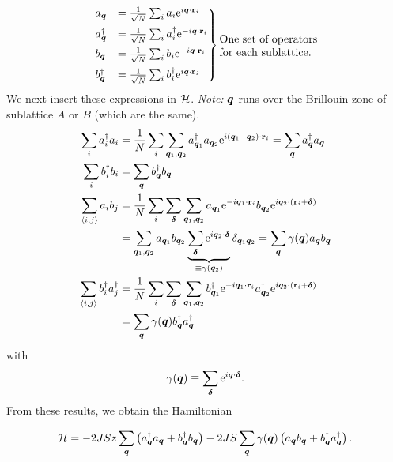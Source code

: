 \begin{equation}
	\begin{rcases}
	a_{\vq} &= \frac{1}{\sqrt{N}}\sum_{i}a_{i} \e^{i\vq\cdot\vb{r}_i} \\
	a_{\vq}^{\dg} &= \frac{1}{\sqrt{N}}\sum_{i}a_i^{\dg} \e^{-i\vq\cdot\vb{r}_i} \\
	b_{\vq} &= \frac{1}{\sqrt{N}}\sum_{i}b_{i} \e^{-i\vq\cdot\vb{r}_i} \\
	b_{\vq}^{\dg} &= \frac{1}{\sqrt{N}}\sum_{i}b_i^{\dg} \e^{i\vq\cdot\vb{r}_i}
	\end{rcases}\parbox[h]{3.1cm}{One set of operators for each sublattice.}
\end{equation}
We next insert these expressions in $\mathcal{H}$. 
\emph{Note:} $\bm{q}$ runs over the Brillouin-zone of sublattice $A$ or $B$ (which are the same).
\begin{align}
		\sum_{i}a_{i}^{\dagger} a_{i} &= \frac{1}{N}\sum_{i}\sum_{\bm{q}_1, \bm{q}_2}a_{\bm{q}_1}^{\dagger}a_{\bm{q}_2}\mathrm{e}^{i(\bm{q}_1-\bm{q}_2)\cdot\vb{r}_i} = \sum_{\bm{q}}a_{\bm{q}}^{\dagger}a_{\bm{q}} \\\
		\sum_{i}b_{i}^{\dagger} b_{i} &=\sum_{\bm{q}}b_{\bm{q}}^{\dagger}b_{\bm{q}} \\
		\sum_{\langle i,j \rangle}a_{i}b_{j} &= \frac{1}{N}\sum_{i}\sum_{\bm{\delta}}\sum_{\bm{q}_1, \bm{q}_2}a_{\bm{q}_1}\mathrm{e}^{-i\bm{q}_1\cdot \vb{r}_i}b_{\bm{q}_2}\mathrm{e}^{i\bm{q}_2\cdot (\vb{r}_i + \bm{\delta})} \nonumber \\
		&=\sum_{\bm{q}_1, \bm{q}_2} a_{\bm{q}_1}b_{\bm{q}_2} \underbrace{\sum_{\bm{\delta}}\mathrm{e}^{i\bm{q}_2\cdot\bm{\delta}}}_{\equiv \gamma(\bm{q}_2)}\delta_{\bm{q}_1\bm{q}_2} =\sum_{\bm{q}}\gamma(\bm{q})a_{\bm{q}}b_{\bm{q}} \\
		\sum_{\langle i,j \rangle}b_{i}^{\dagger}a_{j}^{\dagger} &= \frac{1}{N}\sum_{i}\sum_{\bm{\delta}}\sum_{\bm{q}_1, \bm{q}_2}b_{\bm{q}_1}^{\dagger}\mathrm{e}^{-i\bm{q}_1\cdot \vb{r}_i} a_{\bm{q}_2}^{\dagger}\mathrm{e}^{i\bm{q}_2\cdot (\vb{r}_i + \bm{\delta})} \nonumber \\
		&= \sum_{\bm{q}}\gamma(\bm{q})b_{\bm{q}}^{\dagger}a_{\bm{q}}^{\dagger}
\end{align}
with
\begin{equation}\label{eq:gamma_q}
	\gamma(\bm{q}) \equiv \sum_{\bm{\delta}}\mathrm{e}^{i\bm{q} \cdot\bm{\delta}}.
\end{equation}
From these results, we obtain the Hamiltonian
\begin{tcolorbox}
	\begin{equation}\label{eq:hamiltonian_AFM_momentumspace}
		\mathcal{H} =  -2JSz\sum_{\bm{q}}\left (a_{\bm{q}}^{\dagger}a_{\bm{q}} + b_{\bm{q}}^{\dagger}b_{\bm{q}}\right ) -2JS\sum_{\bm{q}}\gamma(\bm{q})\left (a_{\bm{q}}b_{\bm{q}} +  b_{\bm{q}}^{\dagger}a_{\bm{q}}^{\dagger}\right ) .
	\end{equation}
\end{tcolorbox}
